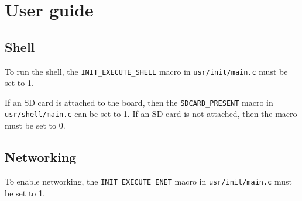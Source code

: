 \chapter{User guide}

\section{Shell}

To run the shell, the \verb|INIT_EXECUTE_SHELL| macro in \verb|usr/init/main.c| must be set to 1.

If an SD card is attached to the board, then the \verb|SDCARD_PRESENT| macro in \verb|usr/shell/main.c| can be set to 1.
If an SD card is not attached, then the macro must be set to 0.

\section{Networking}

To enable networking, the \verb|INIT_EXECUTE_ENET| macro in \verb|usr/init/main.c| must be set to 1.

